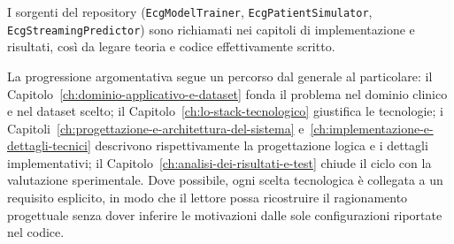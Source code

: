 I sorgenti del repository (\texttt{EcgModelTrainer}, \texttt{EcgPatientSimulator}, \texttt{EcgStreamingPredictor}) sono richiamati nei capitoli di implementazione e risultati, così da legare teoria e codice effettivamente scritto.

La progressione argomentativa segue un percorso dal generale al particolare: il Capitolo~\ref{ch:dominio-applicativo-e-dataset} fonda il problema nel dominio clinico e nel dataset scelto; il Capitolo~\ref{ch:lo-stack-tecnologico} giustifica le tecnologie; i Capitoli~\ref{ch:progettazione-e-architettura-del-sistema} e~\ref{ch:implementazione-e-dettagli-tecnici} descrivono rispettivamente la progettazione logica e i dettagli implementativi; il Capitolo~\ref{ch:analisi-dei-risultati-e-test} chiude il ciclo con la valutazione sperimentale.
Dove possibile, ogni scelta tecnologica è collegata a un requisito esplicito, in modo che il lettore possa ricostruire il ragionamento progettuale senza dover inferire le motivazioni dalle sole configurazioni riportate nel codice.
